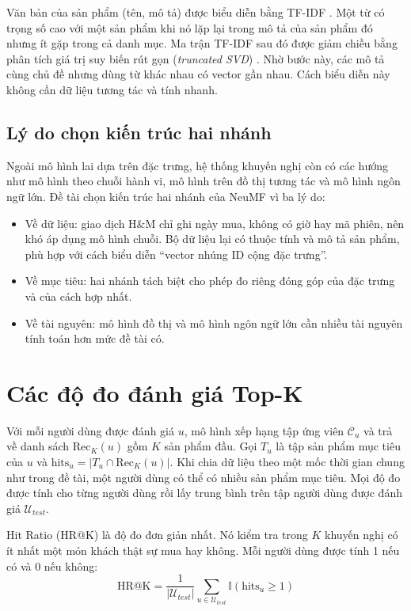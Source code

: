 Văn bản của sản phẩm (tên, mô tả) được biểu diễn bằng TF-IDF \parencite{salton1988term}. Một từ có trọng số cao với một sản phẩm khi nó lặp lại trong mô tả của sản phẩm đó nhưng ít gặp trong cả danh mục. Ma trận TF-IDF sau đó được giảm chiều bằng phân tích giá trị suy biến rút gọn (\textit{truncated SVD}) \parencite{deerwester1990lsa}. Nhờ bước này, các mô tả cùng chủ đề nhưng dùng từ khác nhau có vector gần nhau. Cách biểu diễn này không cần dữ liệu tương tác và tính nhanh.

\subsection{Lý do chọn kiến trúc hai nhánh}
\label{subsec:other_trends}

Ngoài mô hình lai dựa trên đặc trưng, hệ thống khuyến nghị còn có các hướng như mô hình theo chuỗi hành vi, mô hình trên đồ thị tương tác và mô hình ngôn ngữ lớn. Đề tài chọn kiến trúc hai nhánh của NeuMF vì ba lý do:
\begin{itemize}
    \item Về dữ liệu: giao dịch H\&M chỉ ghi ngày mua, không có giờ hay mã phiên, nên khó áp dụng mô hình chuỗi. Bộ dữ liệu lại có thuộc tính và mô tả sản phẩm, phù hợp với cách biểu diễn ``vector nhúng ID cộng đặc trưng''.
    \item Về mục tiêu: hai nhánh tách biệt cho phép đo riêng đóng góp của đặc trưng và của cách hợp nhất.
    \item Về tài nguyên: mô hình đồ thị và mô hình ngôn ngữ lớn cần nhiều tài nguyên tính toán hơn mức đề tài có.
\end{itemize}

\section{Các độ đo đánh giá Top-K}
\label{sec:metrics}

Với mỗi người dùng được đánh giá $u$, mô hình xếp hạng tập ứng viên $\mathcal{C}_u$ và trả về danh sách $\text{Rec}_K(u)$ gồm $K$ sản phẩm đầu. Gọi $T_u$ là tập sản phẩm mục tiêu của $u$ và $\text{hits}_u = |T_u \cap \text{Rec}_K(u)|$. Khi chia dữ liệu theo một mốc thời gian chung như trong đề tài, một người dùng có thể có nhiều sản phẩm mục tiêu. Mọi độ đo được tính cho từng người dùng rồi lấy trung bình trên tập người dùng được đánh giá $\mathcal{U}_{test}$.

Hit Ratio (HR@K) là độ đo đơn giản nhất. Nó kiểm tra trong $K$ khuyến nghị có ít nhất một món khách thật sự mua hay không. Mỗi người dùng được tính 1 nếu có và 0 nếu không:
\begin{equation}
    \text{HR@K} = \frac{1}{|\mathcal{U}_{test}|} \sum_{u \in \mathcal{U}_{test}} \mathbb{I}\left( \text{hits}_u \ge 1 \right)
    \label{eq:hr_k}
\end{equation}

